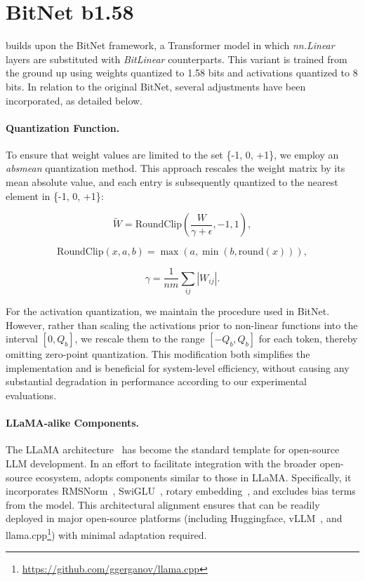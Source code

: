 \section{BitNet b1.58}

 builds upon the BitNet framework, a Transformer model in which \emph{nn.Linear} layers are substituted with \emph{BitLinear} counterparts. This variant is trained from the ground up using weights quantized to 1.58 bits and activations quantized to 8 bits. In relation to the original BitNet, several adjustments have been incorporated, as detailed below.

\paragraph{Quantization Function.} To ensure that weight values are limited to the set \{-1, 0, +1\}, we employ an \emph{absmean} quantization method. This approach rescales the weight matrix by its mean absolute value, and each entry is subsequently quantized to the nearest element in \{-1, 0, +1\}:

\begin{equation}
    \widetilde{W} = \mathrm{RoundClip}(\frac{W}{\gamma + \epsilon}, -1, 1),
\end{equation}

\begin{equation}
    \mathrm{RoundClip}(x, a, b) = \max(a, \min(b, \mathrm{round}(x))),
\end{equation}

\begin{equation}
    \gamma = \frac{1}{nm}\sum_{ij} |W_{ij}|.
\end{equation}

For the activation quantization, we maintain the procedure used in BitNet. However, rather than scaling the activations prior to non-linear functions into the interval $[0, Q_b]$, we rescale them to the range $[-Q_b, Q_b]$ for each token, thereby omitting zero-point quantization. This modification both simplifies the implementation and is beneficial for system-level efficiency, without causing any substantial degradation in performance according to our experimental evaluations.

\paragraph{LLaMA-alike Components.}

The LLaMA architecture~\cite{llama, llama2} has become the standard template for open-source LLM development. In an effort to facilitate integration with the broader open-source ecosystem,  adopts components similar to those in LLaMA. Specifically, it incorporates RMSNorm~\cite{rmsnorm}, SwiGLU~\cite{swiglu}, rotary embedding~\cite{rope}, and excludes bias terms from the model. This architectural alignment ensures that  can be readily deployed in major open-source platforms (including Huggingface, vLLM~\cite{vllm}, and llama.cpp\footnote{\url{https://github.com/ggerganov/llama.cpp}}) with minimal adaptation required.

